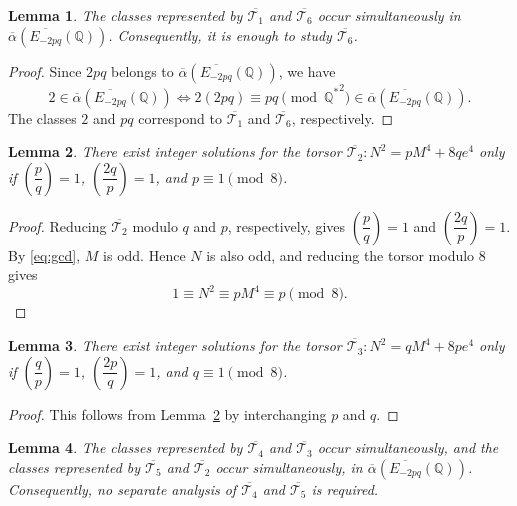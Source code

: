 \documentclass[12pt]{amsart}
\newcommand{\bbQ}{\mathbb{Q}}
\newcommand{\cT}{\mathcal{T}}
\numberwithin{equation}{section}
\newtheorem{lem}{Lemma}[section]
\theoremstyle{definition}
\begin{document}
\begin{lem}
\label{lem:oT1}
The classes represented by $\overline{\cT_1}$ and $\overline{\cT_6}$ occur
simultaneously in $\overline{\alpha}\left(\overline{E_{-2pq}}(\bbQ)\right)$.
Consequently, it is enough to study $\overline{\cT_6}$.
\end{lem}

\begin{proof}
Since $2pq$ belongs to
$\overline{\alpha}\left(\overline{E_{-2pq}}(\bbQ)\right)$, we have
\[
2\in\overline{\alpha}\left(\overline{E_{-2pq}}(\bbQ)\right)
\iff
2(2pq)\equiv pq\pmod{{\bbQ^{*}}^{2}}
\in\overline{\alpha}\left(\overline{E_{-2pq}}(\bbQ)\right).
\]
The classes $2$ and $pq$ correspond to $\overline{\cT_1}$ and
$\overline{\cT_6}$, respectively.
\end{proof}

\begin{lem}
    \label{lem:oT2}
There exist integer solutions for the torsor
$\overline{\cT_{2}}: N^{2}=pM^{4}+8qe^{4}$ only if
$\left(\dfrac{p}{q}\right)=1$, $\left(\dfrac{2q}{p}\right)=1$, and
$p\equiv 1\pmod 8$.
\end{lem}

\begin{proof}
Reducing $\overline{\cT_2}$ modulo $q$ and $p$, respectively, gives
$
\left(\dfrac{p}{q}\right)=1$ and $\left(\dfrac{2q}{p}\right)=1.$
By \eqref{eq:gcd}, $M$ is odd. Hence $N$ is also odd, and reducing the torsor
modulo $8$ gives
\[
1\equiv N^{2}\equiv pM^{4}\equiv p\pmod 8.
\]\end{proof}

\begin{lem}
    \label{lem:oT3}
There exist integer solutions for the torsor
$\overline{\cT_3}: N^2=qM^4+8pe^4$ only if
$\left(\dfrac{q}{p}\right)=1$, $\left(\dfrac{2p}{q}\right)=1$, and
$q\equiv1\pmod 8$.
\end{lem}

\begin{proof}
This follows from Lemma~\ref{lem:oT2} by interchanging $p$ and $q$.
\end{proof}


\begin{lem}
 \label{lem:oT4}
The classes represented by $\overline{\cT_4}$ and $\overline{\cT_3}$ occur
simultaneously, and the classes represented by $\overline{\cT_5}$ and
$\overline{\cT_2}$ occur simultaneously, in
$\overline{\alpha}\left(\overline{E_{-2pq}}(\bbQ)\right)$.
Consequently, no separate analysis of $\overline{\cT_4}$ and
$\overline{\cT_5}$ is required.
\end{lem}
\end{document}
